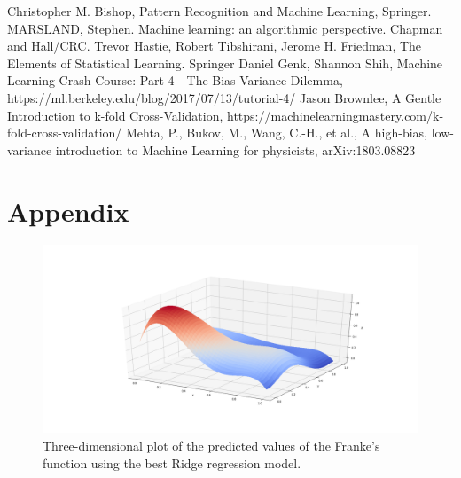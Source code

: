 \documentclass [11pt]{article}
\begin{document}
\newpage
\begin{thebibliography}{111}
\raggedright
{} Christopher M. Bishop, Pattern Recognition and Machine Learning, Springer.
 MARSLAND, Stephen. Machine learning: an algorithmic perspective. Chapman and Hall/CRC.
 Trevor Hastie, Robert Tibshirani, Jerome H. Friedman, The Elements of Statistical Learning. Springer
 Daniel Genk, Shannon Shih, Machine Learning Crash Course: Part 4 - The Bias-Variance Dilemma, https://ml.berkeley.edu/blog/2017/07/13/tutorial-4/
 Jason Brownlee, A Gentle Introduction to k-fold Cross-Validation, https://machinelearningmastery.com/k-fold-cross-validation/
 Mehta, P., Bukov, M., Wang, C.-H., et al., A high-bias, low-variance introduction to Machine Learning for physicists, arXiv:1803.08823 
\end{thebibliography}

\newpage
\appendix
\section{Appendix}
\begin{figure}[H]
\centering
\includegraphics[width=1\textwidth]{figures/RidgeFranke.png}
        \caption{Three-dimensional plot of the predicted values of the Franke’s function using the best Ridge regression model.}
        \label{fig:RidgeFranke}
\end{figure}
\end{document}
